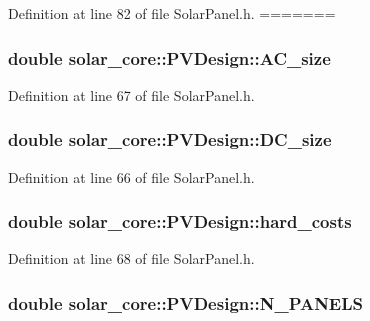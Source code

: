 Definition at line 82 of file Solar\+Panel.\+h.
=======
\subsubsection[{A\+C\+\_\+size}]{\setlength{\rightskip}{0pt plus 5cm}double solar\+\_\+core\+::\+P\+V\+Design\+::\+A\+C\+\_\+size}\label{classsolar__core_1_1_p_v_design_a79a70e7fe3adcbc4e9256db9df38e444}


Definition at line 67 of file Solar\+Panel.\+h.

\hypertarget{classsolar__core_1_1_p_v_design_a21148518ef58004be10b91dc75fdd5b5}{}
\subsubsection[{D\+C\+\_\+size}]{\setlength{\rightskip}{0pt plus 5cm}double solar\+\_\+core\+::\+P\+V\+Design\+::\+D\+C\+\_\+size}\label{classsolar__core_1_1_p_v_design_a21148518ef58004be10b91dc75fdd5b5}


Definition at line 66 of file Solar\+Panel.\+h.

\hypertarget{classsolar__core_1_1_p_v_design_a18cec349cd8f04efcb67562e30416860}{}
\subsubsection[{hard\+\_\+costs}]{\setlength{\rightskip}{0pt plus 5cm}double solar\+\_\+core\+::\+P\+V\+Design\+::hard\+\_\+costs}\label{classsolar__core_1_1_p_v_design_a18cec349cd8f04efcb67562e30416860}


Definition at line 68 of file Solar\+Panel.\+h.

\hypertarget{classsolar__core_1_1_p_v_design_abef277ad010afb4ab6c6c13113a8c017}{}
\subsubsection[{N\+\_\+\+P\+A\+N\+E\+L\+S}]{\setlength{\rightskip}{0pt plus 5cm}double solar\+\_\+core\+::\+P\+V\+Design\+::\+N\+\_\+\+P\+A\+N\+E\+L\+S}\label{classsolar__core_1_1_p_v_design_abef277ad010afb4ab6c6c13113a8c017}


